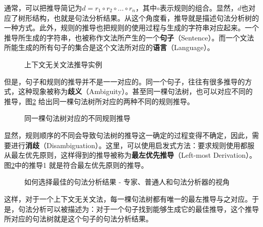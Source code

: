 \parinterval 通常，可以把推导简记为$d=r_1 \circ r_2 \circ ... \circ r_n$，其中$ \circ $表示规则的组合。显然，$d$也对应了树形结构，也就是句法分析结果。从这个角度看，推导就是描述句法分析树的一种方式。此外，规则的推导也把规则的使用过程与生成的字符串对应起来。一个推导所生成的字符串，也被称作文法所产生的一个{\small\sffamily\bfseries{句子}}（Sentence）。而一个文法所能生成的所有句子的集合是这个文法所对应的{\small\sffamily\bfseries{语言}}（Language）。

\begin{figure}[htp]
    \centering

	\caption{上下文无关文法推导实例}
    \label{fig:3.4-3}
\end{figure}

\parinterval 但是，句子和规则的推导并不是一一对应的。同一个句子，往往有很多推导的方式，这种现象被称为{\small\sffamily\bfseries{歧义}}（Ambiguity）。甚至同一棵句法树，也可以对应不同的推导，图\ref{fig:3.4-4} 给出同一棵句法树所对应的两种不同的规则推导。

\begin{figure}[htp]
    \centering

\setlength{\abovecaptionskip}{-0.5em}
	\caption{同一棵句法树对应的不同规则推导}
    \label{fig:3.4-4}
\end{figure}
\parinterval 显然，规则顺序的不同会导致句法树的推导这一确定的过程变得不确定，因此，需要进行{\small\sffamily\bfseries{消歧}}（Disambiguation）。这里，可以使用启发式方法：要求规则使用都服从最左优先原则，这样得到的推导被称为{\small\sffamily\bfseries{最左优先推导}}（Left-most Derivation）。图\ref{fig:3.4-4}中的推导1 就是符合最左优先原则的推导。

\begin{figure}[htp]
    \centering

	\caption{如何选择最佳的句法分析结果 - 专家、普通人和句法分析器的视角}
    \label{fig:3.4-5}
\end{figure}

\parinterval 这样，对于一个上下文无关文法，每一棵句法树都有唯一的最左推导与之对应。于是，句法分析可以被描述为：对于一个句子找到能够生成它的最佳推导，这个推导所对应的句法树就是这个句子的句法分析结果。

